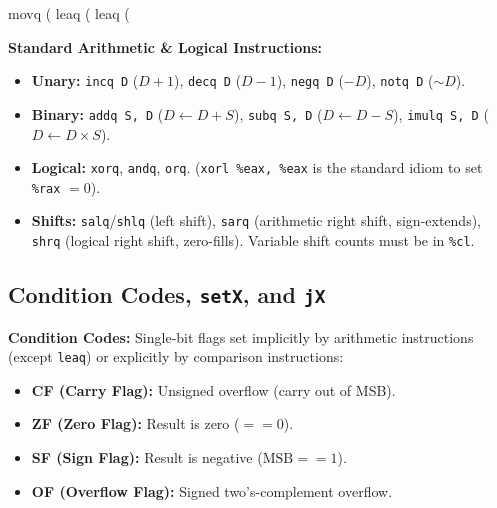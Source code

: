 \begin{codeexample}
movq (%
leaq (%
leaq (%
\end{codeexample}

\begin{definition}
    \textbf{Standard Arithmetic \& Logical Instructions:}
    \begin{itemize}
        \item \textbf{Unary:} \texttt{incq D} ($D+1$), \texttt{decq D} ($D-1$), \texttt{negq D} ($-D$), \texttt{notq D} ($\sim D$).
        \item \textbf{Binary:} \texttt{addq S, D} ($D \leftarrow D + S$), \texttt{subq S, D} ($D \leftarrow D - S$), \texttt{imulq S, D} ($D \leftarrow D \times S$).
        \item \textbf{Logical:} \texttt{xorq}, \texttt{andq}, \texttt{orq}. (\texttt{xorl \%eax, \%eax} is the standard idiom to set \texttt{\%rax} $= 0$).
        \item \textbf{Shifts:} \texttt{salq}/\texttt{shlq} (left shift), \texttt{sarq} (arithmetic right shift, sign-extends), \texttt{shrq} (logical right shift, zero-fills). Variable shift counts must be in \texttt{\%cl}.
    \end{itemize}
\end{definition}

\subsection{Condition Codes, \texttt{setX}, and \texttt{jX}}

\begin{definition}
    \textbf{Condition Codes:} Single-bit flags set implicitly by arithmetic instructions (except \texttt{leaq}) or explicitly by comparison instructions:
    \begin{itemize}
        \item \textbf{CF (Carry Flag):} Unsigned overflow (carry out of MSB).
        \item \textbf{ZF (Zero Flag):} Result is zero ($== 0$).
        \item \textbf{SF (Sign Flag):} Result is negative ($\text{MSB} == 1$).
        \item \textbf{OF (Overflow Flag):} Signed two's-complement overflow.
    \end{itemize}
\end{definition}

